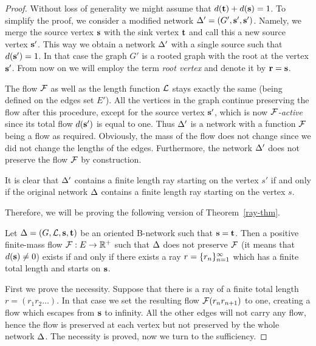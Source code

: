 \documentclass[12pt,oneside,a4paper]{amsart}
\begin{document}
    \begin{proof}
      Without loss of generality we might assume that $d(\mathbf{t}) + d(\mathbf{s}) = 1$.
      To simplify the proof, we consider a modified network $\Delta' = (G', \mathbf{s}', \mathbf{s}')$.
      Namely, we merge the source vertex $\mathbf{s}$ with the sink vertex $\mathbf{t}$ and call this a new source vertex $\mathbf{s}'$.
      This way we obtain a network $\Delta'$ with a single source such that $d(\mathbf{s}') = 1$.
      In that case the graph $G'$ is a rooted graph with the root at the vertex $\mathbf{s}'$.
      From now on we will employ the term \emph{root vertex} and denote it by $\mathbf{r} = \mathbf{s}$.

      The flow $\mathcal{F}$ as well as the length function $\mathcal{L}$ stays exactly the same (being defined on the edges set $E'$).
      All the vertices in the graph continue preserving the flow after this procedure, except for the source vertex $\mathbf{s}'$,
        which is now \emph{$\mathcal{F}$-active} since its total flow $d(\mathbf{s}')$ is equal to one.
      Thus $\Delta'$ is a network with a function $\mathcal{F}$ being a flow as required.
      Obviously, the mass of the flow does not change since we did not change the lengths of the edges.
      Furthermore, the network $\Delta'$ does not preserve the flow $\mathcal{F}$ by construction.

      It is clear that $\Delta'$ contains a finite length ray starting on the vertex $s'$ if and only if the original network $\Delta$ contains a finite
        length ray starting on the vertex $s$.

      Therefore, we will be proving the following version of Theorem~\ref{ray-thm}.
      \begin{theorem*}
        Let $\Delta = (G, \mathcal{L}, \mathbf{s}, \mathbf{t})$ be an oriented B-network such that $\mathbf{s} = \mathbf{t}$.
        Then a positive finite-mass flow $\mathcal{F}: E \to \mathbb{R}^{+}$ such that
          $\Delta$ does not preserve $\mathcal{F}$ (it means that $d(\mathbf{s}) \neq 0$)
          exists if and only if there exists a ray $r = \{{r}_n\}_{n=1}^\infty$ which has a finite total length and starts on $\mathbf{s}$.
      \end{theorem*}
      First we prove the necessity.
      Suppose that there is a ray of a finite total length $r=(r_1 r_2 \dots)$.
      In that case we set the resulting flow $\mathcal{F}(r_n r_{n+1})$ to one, creating a flow which escapes
        from $\mathbf{s}$ to infinity.
      All the other edges will not carry any flow, hence the flow is preserved
        at each vertex but not preserved by the whole network $\Delta$.
      The necessity is proved, now we turn to the sufficiency.
      \smallskip

\end{proof}
\end{document}
